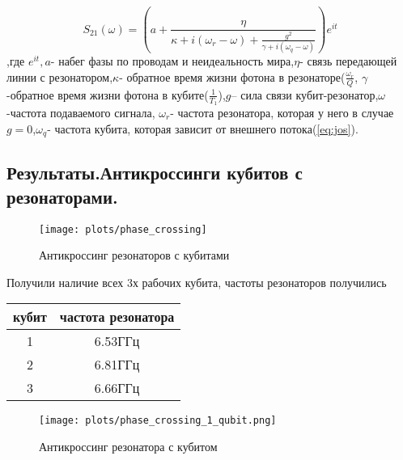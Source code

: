 \documentclass[12pt, a4paper, openany]{book}
\begin{document}
\begin{equation}
S_{21}(\omega)=(a+\frac{\eta}{\kappa+i(\omega_r-\omega)+\frac{g^2}
{\gamma+i(\omega_q-\omega)}})e^{it}
\end{equation}
,где $e^{it},a$- набег фазы по проводам и неидеальность мира,$\eta$- связь передающей линии с резонатором,$\kappa$- обратное время жизни фотона в резонаторе($\frac{\omega_r}{Q}$, $\gamma$-обратное время жизни фотона в кубите($\frac{1}{T_1}$),$g$-- сила связи кубит-резонатор,$\omega$-частота подаваемого сигнала, $\omega_r$- частота резонатора, которая у него в случае $g=0$,$\omega_q$- частота кубита, которая зависит от внешнего потока(\ref{eq:jos}).  



\newpage
\subsection{Результаты.Антикроссинги кубитов с резонаторами.}
\begin{figure}[h]
		\begin{center}
\texttt{[image: plots/phase\_crossing]}
\caption{Антикроссинг резонаторов с кубитами}
		\end{center}
		\label{fig:anticrossings}
	\end{figure}
Получили наличие всех 3х рабочих кубита, частоты резонаторов получились 
\begin{center}
\begin{tabular}{|c|c|}
\hline
кубит & частота резонатора \\ \hline
1 & 6.53ГГц\\ \hline
2 & 6.81ГГц\\ \hline
3 & 6.66ГГц\\ \hline
\end{tabular}
\end{center}
\begin{figure}[h]
		\begin{center}
\texttt{[image: plots/phase\_crossing\_1\_qubit.png]}
\caption{Антикроссинг резонатора с кубитом}
		\end{center}
	\end{figure}
	\label{fig:anticrossings}

	
\newpage
\end{document}
